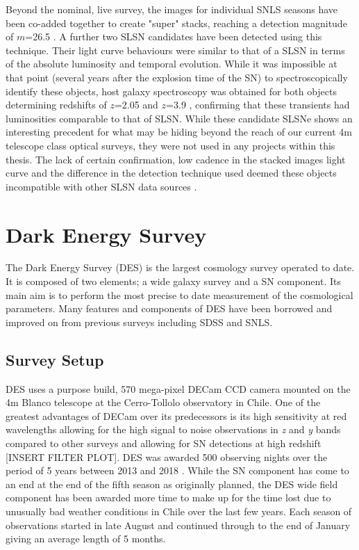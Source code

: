 Beyond the nominal, live survey, the images for individual SNLS seasons have been co-added together to create "super" stacks, reaching a detection magnitude of $m$=26.5 \citep{Cooke2012}. A further two SLSN candidates have been detected using this technique. Their light curve behaviours were similar to that of a SLSN in terms of the absolute luminosity and temporal evolution. While it was impossible at that point (several years after the explosion time of the SN) to spectroscopically identify these objects, host galaxy spectroscopy was obtained for both objects determining redshifts of $z$=2.05 and $z$=3.9 \citep{Cooke2012}, confirming that these transients had luminosities comparable to that of SLSN. While these candidate SLSNe shows an interesting precedent for what may be hiding beyond the reach of our current 4m telescope class optical surveys, they were not used in any projects within this thesis. The lack of certain confirmation, low cadence in the stacked images light curve and the difference in the detection technique used deemed these objects incompatible with other SLSN data sources \citep{Prajs2016}.

\section{Dark Energy Survey}
The Dark Energy Survey (DES) is the largest cosmology survey operated to date. It is composed of two elements; a wide galaxy survey and a SN component. Its main aim is to perform the most precise to date measurement of the cosmological parameters. Many features and components of DES have been borrowed and improved on from previous surveys including SDSS and SNLS.

\subsection{Survey Setup}
DES uses a purpose build, 570 mega-pixel DECam CCD camera \citep{Honscheid2008,Flaugher2015} mounted on the 4m Blanco telescope at the Cerro-Tollolo observatory in Chile. One of the greatest advantages of DECam over its predecessors is its high sensitivity at red wavelengths allowing for the high signal to noise observations in \textit{z} and \textit{y} bands compared to other surveys and allowing for SN detections at high redshift [INSERT FILTER PLOT]. DES was awarded 500 observing nights over the period of 5 years between 2013 and 2018 \citep{DES2016}. While the SN component has come to an end at the end of the fifth season as originally planned, the DES wide field component has been awarded more time to make up for the time lost due to unusually bad weather conditions in Chile over the last few years. Each season of observations started in late August and continued through to the end of January giving an average length of 5 months.

